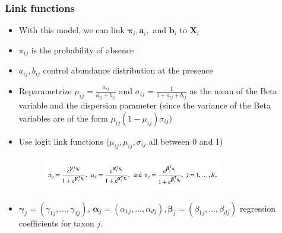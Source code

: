 \documentclass{beamer}
\begin{document}
\begin{frame}
\frametitle{Link functions}
\begin{itemize}
  \item With this model, we can link $\boldsymbol\pi_i, \bm{a}_i,$ and $\bm{b}_i$ to $\bm{X}_i$
  \item $\pi_{ij}$ is the probability of absence %
  \item $a_{ij}, b_{ij}$ control abundance distribution at the presence
  \item Reparametrize $\mu_{ij} = \frac{a_{ij}}{a_{ij} + b_{ij}}$ and $\sigma_{ij} = \frac{1}{1 + a_{ij} + b_{ij}}$ as the mean of the Beta variable and the dispersion parameter (since the variance of the Beta variables are of the form $\mu_{ij}(1 - \mu_{ij})\sigma_{ij}$)
  \item Use logit link functions ($\mu_{ij}, \mu_{ij}, \sigma_{ij}$ all between 0 and 1)
   \begin{figure}[!htb]
	\centering
	\includegraphics[width=0.75\textwidth]{img/2022.02.10_Zero_Inflated_generalized_Dirichlet_Multinomial-5360be17.png}
\end{figure}
\item $\boldsymbol\gamma_j = (\gamma_{1j}, \ldots, \gamma_{dj})$, $\boldsymbol\alpha_j = (\alpha_{1j}, \ldots , \alpha_{dj}), \boldsymbol\beta_j = (\beta_{1j}, \ldots , \beta_{dj})$ regression coefficients for taxon $j$.
\end{itemize}
\end{frame}
\end{document}

